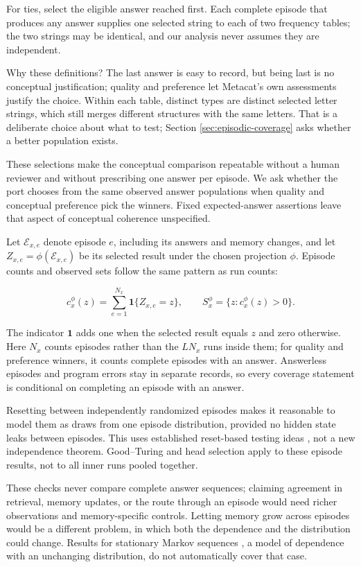 \documentclass[10pt,letterpaper]{article}
\begin{document}
For ties, select the eligible answer reached first. Each complete episode that produces
any answer supplies one selected string to each of two frequency tables; the two strings
may be identical, and our analysis never assumes they are independent.

Why these definitions? The last answer is easy to record, but being last is no conceptual
justification; quality and preference let Metacat's own assessments justify the choice.
Within each table, distinct types are distinct selected letter strings, which still merges
different structures with the same letters. That is a deliberate choice about what to
test; Section \ref{sec:episodic-coverage} asks whether a better population exists.

These selections make the conceptual comparison repeatable without a human reviewer and
without prescribing one answer per episode. We ask whether the port chooses from the same
observed answer populations when quality and conceptual preference pick the winners. Fixed
expected-answer assertions leave that aspect of conceptual coherence unspecified.

Let \(\mathcal E_{x,e}\) denote episode \(e\), including its answers and memory changes,
and let \(Z_{x,e}=\phi(\mathcal E_{x,e})\) be its selected result under the chosen
projection \(\phi\). Episode counts and observed sets follow the same pattern as run
counts:

\[
c_x^\phi(z)=\sum_{e=1}^{N_x}\mathbf 1\{Z_{x,e}=z\},\qquad
S_x^\phi=\{z:c_x^\phi(z)>0\}.
\]

The indicator \(\mathbf 1\) adds one when the selected result equals \(z\) and zero
otherwise. Here \(N_x\) counts episodes rather than the \(L N_x\) runs inside them; for
quality and preference winners, it counts complete episodes with an answer. Answerless
episodes and program errors stay in separate records, so every coverage statement is
conditional on completing an episode with an answer.

Resetting between independently randomized episodes makes it reasonable to model them as
draws from one episode distribution, provided no hidden state leaks between episodes. This
uses established reset-based testing ideas \citep{ref34}, not a new independence theorem.
Good--Turing and head selection apply to these episode results, not to all inner runs
pooled together.

These checks never compare complete answer sequences; claiming agreement in retrieval,
memory updates, or the route through an episode would need richer observations and
memory-specific controls. Letting memory grow across episodes would be a different
problem, in which both the dependence and the distribution could change. Results for
stationary Markov sequences \citep{ref35}, a model of dependence with an unchanging
distribution, do not automatically cover that case.
\end{document}
